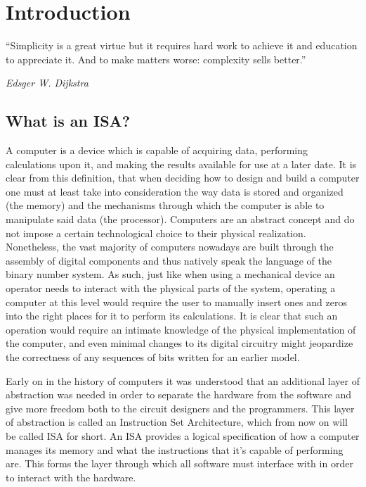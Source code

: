 \chapter{Introduction}
\epigraph{``Simplicity is a great virtue but it requires hard work to achieve it and education to appreciate it. And to make matters worse: complexity sells better.''}{\textit{Edsger W. Dijkstra}}

\section*{What is an ISA?}

A computer is a device which is capable of acquiring data, performing calculations upon it, and making the results available for use at a later date.
It is clear from this definition, that when deciding how to design and build a computer one must at least take into consideration the way data is 
stored and organized (the memory) and the mechanisms through which the computer is able to manipulate said data (the processor).
Computers are an abstract concept and do not impose a certain technological choice to their physical realization. Nonetheless, the vast majority of computers nowadays
are built through the assembly of digital components and thus natively speak the language of the binary number system.
As such, just like when using a mechanical device an operator needs to interact with the physical parts of the system,  operating a computer at this level
would require the user to manually insert ones and zeros into the right places for it to perform its calculations.
It is clear that such an operation would require an intimate knowledge of the physical implementation of the computer, and even minimal
changes to its digital circuitry might jeopardize the correctness of any sequences of bits written for an earlier model.

Early on in the history of computers it was understood that an additional layer of abstraction was needed in order to separate the hardware from the software
and give more freedom both to the circuit designers and the programmers. This layer of abstraction is called an Instruction Set Architecture,
which from now on will be called ISA for short. An ISA provides a logical specification of how a computer manages its memory and what the instructions that it's
capable of performing are. This forms the layer through which all software must interface with in order to interact with the hardware.

